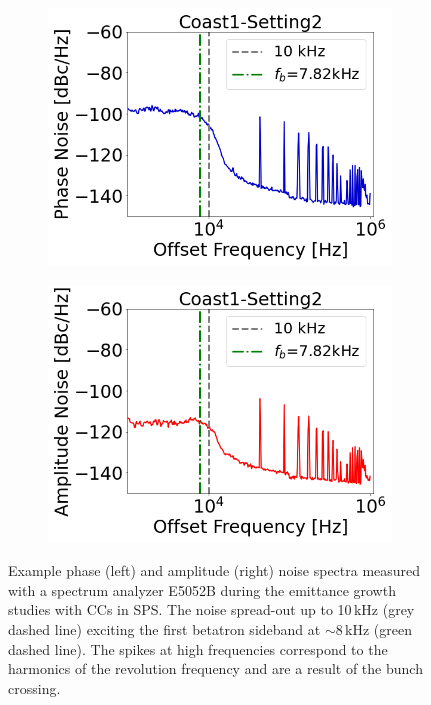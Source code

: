  \begin{figure}[!ht]
    \centering
    \begin{subfigure}[t]{0.45\textwidth}
        \centering
        \includegraphics[width=1\textwidth]{images/Ch5/Measured_spectrum_MD5_Coast1-Setting2-PN.csv_no_psd.png}
    \end{subfigure}
    \hfill
    \begin{subfigure}[t]{0.45\textwidth}
        \centering
        \includegraphics[width=1\textwidth]{images/Ch5/Measured_spectrum_MD5_Coast1-Setting2-AN.csv_no_psd.png}
    \end{subfigure}
    \hfill
     \caption{Example phase (left) and amplitude (right) noise spectra measured with a spectrum analyzer E5052B during the emittance growth studies with CCs in SPS. The noise spread-out up to 10\,kHz (grey dashed line) exciting the first betatron sideband at $\sim$8\,kHz (green dashed line). The spikes at high frequencies correspond to the harmonics of the revolution frequency and are a result of the bunch crossing.} %
     \label{fig:example_PN_and_AN}
\end{figure}

